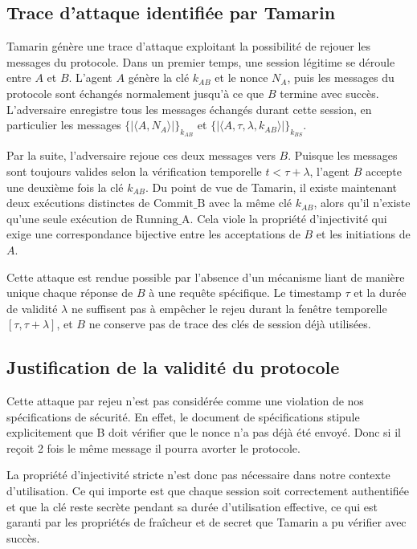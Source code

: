 \documentclass[11pt]{article}
\begin{document}
\subsection{Trace d'attaque identifiée par Tamarin}

Tamarin génère une trace d'attaque exploitant la possibilité de rejouer les messages du protocole.
Dans un premier temps, une session légitime se déroule entre $A$ et $B$. L'agent $A$ génère la 
clé $k_{AB}$ et le nonce $N_A$, puis les messages du protocole sont échangés normalement jusqu'à
ce que $B$ termine avec succès. L'adversaire enregistre tous les messages échangés durant cette 
session, en particulier les messages $\{|\langle A, N_A \rangle|\}_{k_{AB}}$ et $\{|\langle A, \tau, \lambda, k_{AB} \rangle|\}_{k_{BS}}$.

Par la suite, l'adversaire rejoue ces deux messages vers $B$. Puisque les messages sont toujours 
valides selon la vérification temporelle $t < \tau + \lambda$, l'agent $B$ accepte une deuxième 
fois la clé $k_{AB}$. Du point de vue de Tamarin, il existe maintenant deux exécutions distinctes 
de $\text{Commit\_B}$ avec la même clé $k_{AB}$, alors qu'il n'existe qu'une seule exécution de 
$\text{Running\_A}$. Cela viole la propriété d'injectivité qui exige une correspondance bijective 
entre les acceptations de $B$ et les initiations de $A$.

Cette attaque est rendue possible par l'absence d'un mécanisme liant de manière unique chaque 
réponse de $B$ à une requête spécifique. Le timestamp $\tau$ et la durée de validité $\lambda$ 
ne suffisent pas à empêcher le rejeu durant la fenêtre temporelle $[\tau, \tau + \lambda]$, et 
$B$ ne conserve pas de trace des clés de session déjà utilisées.

\subsection{Justification de la validité du protocole}

Cette attaque par rejeu n'est pas considérée comme une violation de nos spécifications de 
sécurité. En effet, le document de spécifications stipule explicitement que B doit vérifier
que le nonce n'a pas déjà été envoyé. Donc si il reçoit 2 fois le même message il pourra avorter
le protocole.

La propriété d'injectivité stricte n'est donc pas nécessaire dans notre contexte d'utilisation.
Ce qui importe est que chaque session soit correctement authentifiée et que la clé reste secrète 
pendant sa durée d'utilisation effective, ce qui est garanti par les propriétés de fraîcheur et 
de secret que Tamarin a pu vérifier avec succès.
\end{document}
